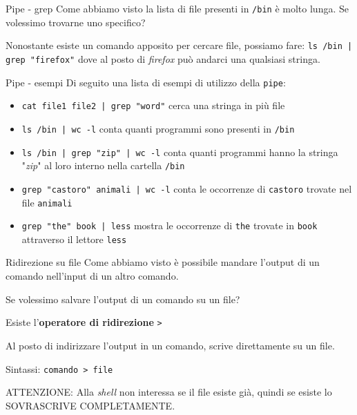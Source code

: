 \documentclass{beamer}
\begin{document}
\begin{frame}{Pipe - grep}
  Come abbiamo visto la lista di file presenti in \texttt{/bin} è molto lunga.
  Se volessimo trovarne uno specifico?\pause \bigskip

  Nonostante esiste un comando apposito per cercare file, possiamo fare:
  \texttt{ls /bin | grep "firefox"} dove al posto di \textit{firefox} può 
  andarci una qualsiasi stringa.
\end{frame}

\begin{frame}{Pipe - esempi}
  Di seguito una lista di esempi di utilizzo della \texttt{pipe}:
  \begin{itemize}
    \item \texttt{cat file1 file2 | grep "word"} cerca una stringa in più file
    \item \texttt{ls /bin | wc -l} conta quanti programmi sono presenti in 
      \texttt{/bin}
    \item \texttt{ls /bin | grep "zip" | wc -l} conta quanti programmi hanno
      la stringa "\textit{zip}" al loro interno nella cartella \texttt{/bin}
    \item \texttt{grep "castoro" animali | wc -l} conta le occorrenze di 
      \texttt{castoro} trovate nel file \texttt{animali}
    \item \texttt{grep "the" book | less} mostra le occorrenze di \texttt{the} 
      trovate in \texttt{book} attraverso il lettore \texttt{less}
  \end{itemize}
\end{frame}

\begin{frame}{Ridirezione su file}
  Come abbiamo visto è possibile mandare l'output di un comando nell'input di
  un altro comando.\bigskip

  Se volessimo salvare l'output di un comando su un file?\pause

  Esiste l'\textbf{operatore di ridirezione} \texttt{>}\bigskip

  Al posto di indirizzare l'output in un comando, scrive direttamente su un
  file.\bigskip

  Sintassi: \texttt{comando > file}\bigskip

  ATTENZIONE: Alla \textit{shell} non interessa se il file esiste già, quindi se 
  esiste lo SOVRASCRIVE COMPLETAMENTE.
\end{frame}
\end{document}
